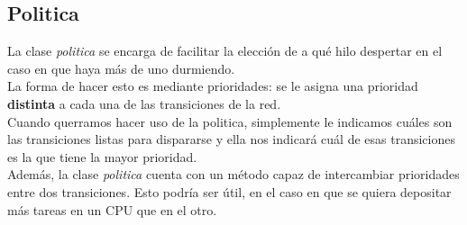 \documentclass{article}
\begin{document}
    \subsection{Politica}
    \begin{flushleft}
        La clase \emph{politica} se encarga de facilitar la elección de a qué hilo despertar en 
        el caso en que haya más de uno durmiendo. \\
        La forma de hacer esto es mediante prioridades: se le asigna una prioridad \textbf{distinta}
        a cada una de las transiciones de la red. \\
        Cuando querramos hacer uso de la politica, simplemente le indicamos cuáles son las
        transiciones listas para dispararse y ella nos indicará cuál de esas transiciones es la
        que tiene la mayor prioridad. \\
        Además, la clase \emph{politica} cuenta con un método capaz de intercambiar prioridades
        entre dos transiciones. Esto podría ser útil, en el caso en que se quiera depositar más
        tareas en un CPU que en el otro.
    \end{flushleft}
\end{document}
